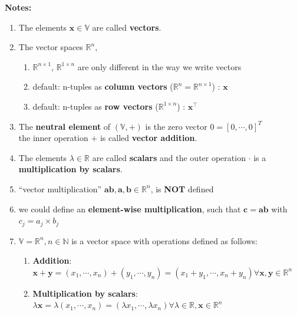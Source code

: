 \textbf{Notes:}
\begin{enumerate}
    \item The elements $\mathbf{x}\in\mathbb{V}$ are called \textbf{vectors}.
        \item The vector spaces $\mathbb{R}^n$, 
        \begin{enumerate}
            \item $\mathbb{R}^{n\times 1}$, $\mathbb{R}^{1\times n}$ are only different in the way we write vectors
        
            \item default: n-tuples as \textbf{column vectors} ($\mathbb{R}^n = \mathbb{R}^{n \times 1}$) : $\mathbf{x}$
    
            \item default: n-tuples as \textbf{row vectors} ($\mathbb{R}^{1 \times n}$) : $\mathbf{x}^\top$
        \end{enumerate}

    \item The \textbf{neutral element} of $(\mathbb{V}, +)$ is the zero vector $0 = [0, \cdots, 0]^T$ \\
    the inner operation $+$ is called \textbf{vector addition}.

    \item The elements $\lambda\in\mathbb{R}$ are called \textbf{scalars} and the outer operation $\cdot$ is a \textbf{multiplication by scalars}.

    \item “vector multiplication” $\mathbf{ab, a, b} \in \mathbb{R}^n$, is \textbf{NOT} defined

    \item we could define an \textbf{element-wise multiplication}, such that $\mathbf{c = ab}$ with $c_j = a_j \times b_j$

    \item $\mathbb{V} = \mathbb{R}^n, n \in \mathbb{N}$ is a vector space with operations defined as follows:
    \begin{enumerate}
        \item \textbf{Addition}:\\ $\mathbf{x+y} = (x_1, \cdots, x_n)+(y_1, \cdots, y_n) = (x_1+y_1, \cdots, x_n+y_n) \forall \mathbf{x, y} \in \mathbb{R}^n$

        \item \textbf{Multiplication by scalars}:\\ $\lambda\mathbf{x} = \lambda(x_1, \cdots, x_n) = (\lambda x_1, \cdots, \lambda x_n) \forall \lambda \in \mathbb{R}, \mathbf{x} \in \mathbb{R}^n$
        

\end{enumerate}
\end{enumerate}
